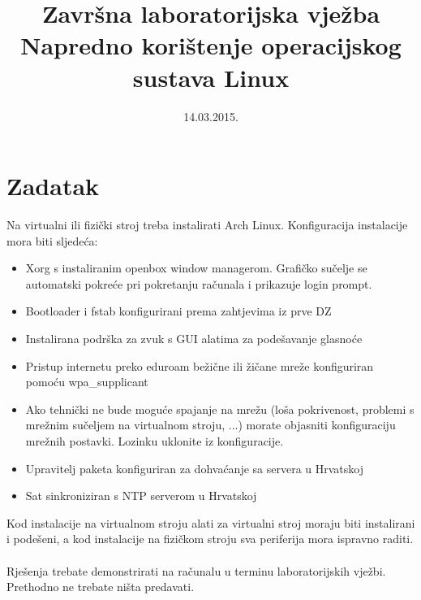 \documentclass[12pt,a4paper]{article}
\begin{document}
	\title{Završna laboratorijska vježba\\{\large Napredno korištenje operacijskog sustava Linux}}
	\date{\vspace{-5ex} 14.03.2015.}
	\maketitle
	\section*{Zadatak}
	Na virtualni ili fizički stroj treba instalirati Arch Linux. Konfiguracija instalacije mora biti sljedeća:
	\begin{itemize}
		\item Xorg s instaliranim openbox window managerom. Grafičko sučelje se automatski pokreće pri pokretanju računala i prikazuje login prompt.
		\item Bootloader i fstab konfigurirani prema zahtjevima iz prve DZ
		\item Instalirana podrška za zvuk s GUI alatima za podešavanje glasnoće
		\item Pristup internetu preko eduroam bežične ili žičane mreže konfiguriran pomoću wpa\_supplicant
		\item[] {\small Ako tehnički ne bude moguće spajanje na mrežu (loša pokrivenost, problemi s mrežnim sučeljem na virtualnom stroju, ...) morate objasniti konfiguraciju mrežnih postavki. Lozinku uklonite iz konfiguracije.}
		\item Upravitelj paketa konfiguriran za dohvaćanje sa servera u Hrvatskoj
		\item Sat sinkroniziran s NTP serverom u Hrvatskoj\\
	\end{itemize}
	Kod instalacije na virtualnom stroju alati za virtualni stroj moraju biti instalirani i podešeni, a kod instalacije na fizičkom stroju sva periferija mora ispravno raditi.\\
	\,\\
	Rješenja trebate demonstrirati na računalu u terminu laboratorijskih vježbi. Prethodno ne trebate ništa predavati.
\end{document}
